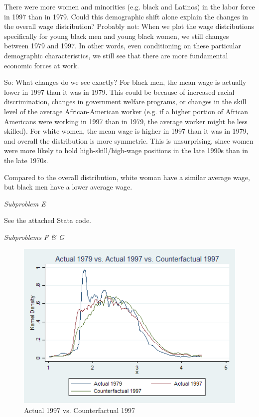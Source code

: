 \documentclass[11pt]{article}
\begin{document}
There were more women and minorities (e.g. black and Latinos) in the labor force in 1997 than in 1979. Could this demographic shift alone explain the changes in the overall wage distribution? Probably not: When we plot the wage distributions specifically for young black men and young black women, we still changes between 1979 and 1997. In other words, even conditioning on these particular demographic characteristics, we still see that there are more fundamental economic forces at work.

\bigskip So: What changes do we see exactly? For black men, the mean wage is actually lower in 1997 than it was in 1979. This could be because of increased racial discrimination, changes in government welfare programs, or changes in the skill level of the average African-American worker (e.g. if a higher portion of African Americans were working in 1997 than in 1979, the average worker might be less skilled). For white women, the mean wage is higher in 1997 than it was in 1979, and overall the distribution is more symmetric. This is unsurprising, since women were more likely to hold high-skill/high-wage positions in the late 1990s than in the late 1970s.

\bigskip Compared to the overall distribution, white woman have a similar average wage, but black men have a lower average wage.

\bigskip \textit{Subproblem E}

\bigskip See the attached Stata code.

\bigskip \textit{Subproblems F \& G}

\begin{figure}[H]
	\caption{Actual 1997 vs. Counterfactual 1997}
	\centering
	\includegraphics[width=.75\textwidth]{Kernel_Density_1997_C1997.png}
\end{figure}
\end{document}
